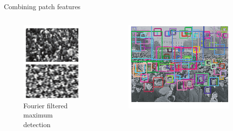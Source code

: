 \documentclass[11pt)]{beamer}
\begin{document}
\begin{frame}{Combining patch features}
\begin{columns}[t]
	\begin{column}{.33\textwidth}
		\begin{figure}[ht]
			\centering
			\includegraphics[width=\textwidth]{fourier}
			\caption{Fourier filtered maximum detection}
		\end{figure}
	\end{column}
	\begin{column}{.33\textwidth}
		\begin{figure}[ht]
			\centering
			\includegraphics[width=\textwidth]{head_detection}

\end{figure}
\end{column}
\end{columns}
\end{frame}
\end{document}
